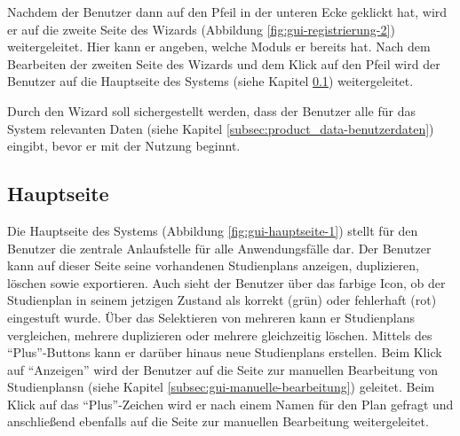 Nachdem der \gls{Benutzer} dann auf den Pfeil in der unteren Ecke geklickt hat, wird er auf die zweite Seite des \gls{Wizard}s (Abbildung \ref{fig:gui-registrierung-2}) weitergeleitet. Hier kann er angeben, welche \glspl{Modul} er bereits  hat. 
Nach dem Bearbeiten der zweiten Seite des \gls{Wizard}s und dem Klick auf den Pfeil wird der \gls{Benutzer} auf die Hauptseite des Systems (siehe Kapitel \ref{subsec:gui-hauptseite}) weitergeleitet.

Durch den \gls{Wizard} soll sichergestellt werden, dass der \gls{Benutzer} alle für das System relevanten Daten (siehe Kapitel \ref{subsec:product_data-benutzerdaten}) eingibt, bevor er mit der Nutzung beginnt.


\subsection{Hauptseite}
\label{subsec:gui-hauptseite}
Die Hauptseite des Systems (Abbildung \ref{fig:gui-hauptseite-1}) stellt für den \gls{Benutzer} die zentrale Anlaufstelle für alle Anwendungsfälle dar. Der \gls{Benutzer} kann auf dieser Seite seine vorhandenen \glspl{Studienplan} anzeigen, duplizieren, löschen sowie exportieren. Auch sieht der \gls{Benutzer} über das farbige Icon, ob der \gls{Studienplan} in seinem jetzigen Zustand als korrekt (grün) oder fehlerhaft (rot) eingestuft wurde. Über das Selektieren von mehreren  kann er \glspl{Studienplan} vergleichen, mehrere duplizieren oder mehrere gleichzeitig löschen. Mittels des \enquote{Plus}-Buttons kann er darüber hinaus neue \glspl{Studienplan} erstellen.\newline
Beim Klick auf \enquote{Anzeigen} wird der \gls{Benutzer} auf die Seite zur manuellen Bearbeitung von \glspl{Studienplan}n (siehe Kapitel \ref{subsec:gui-manuelle-bearbeitung}) geleitet. Beim Klick auf das \enquote{Plus}-Zeichen wird er nach einem Namen für den Plan gefragt und anschließend ebenfalls auf die Seite zur manuellen Bearbeitung weitergeleitet.


